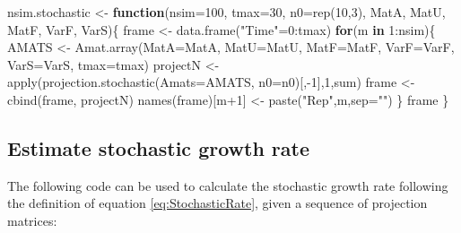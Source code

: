 \documentclass[
]{book}
\newenvironment{Shaded}{\begin{snugshade}}{\end{snugshade}}
\newcommand{\AttributeTok}[1]{\textcolor[rgb]{0.77,0.63,0.00}{#1}}
\newcommand{\ControlFlowTok}[1]{\textcolor[rgb]{0.13,0.29,0.53}{\textbf{#1}}}
\newcommand{\DecValTok}[1]{\textcolor[rgb]{0.00,0.00,0.81}{#1}}
\newcommand{\FunctionTok}[1]{\textcolor[rgb]{0.00,0.00,0.00}{#1}}
\newcommand{\NormalTok}[1]{#1}
\newcommand{\OtherTok}[1]{\textcolor[rgb]{0.56,0.35,0.01}{#1}}
\newcommand{\SpecialCharTok}[1]{\textcolor[rgb]{0.00,0.00,0.00}{#1}}
\newcommand{\StringTok}[1]{\textcolor[rgb]{0.31,0.60,0.02}{#1}}
\begin{document}
\begin{Shaded}
\begin{Highlighting}[]
\NormalTok{nsim.stochastic }\OtherTok{\textless{}{-}} \ControlFlowTok{function}\NormalTok{(}\AttributeTok{nsim=}\DecValTok{100}\NormalTok{, }\AttributeTok{tmax=}\DecValTok{30}\NormalTok{, }\AttributeTok{n0=}\FunctionTok{rep}\NormalTok{(}\DecValTok{10}\NormalTok{,}\DecValTok{3}\NormalTok{), MatA, MatU, MatF, VarF, VarS)\{}
\NormalTok{  frame }\OtherTok{\textless{}{-}}  \FunctionTok{data.frame}\NormalTok{(}\StringTok{"Time"}\OtherTok{=}\DecValTok{0}\SpecialCharTok{:}\NormalTok{tmax)}
  \ControlFlowTok{for}\NormalTok{(m }\ControlFlowTok{in} \DecValTok{1}\SpecialCharTok{:}\NormalTok{nsim)\{}
\NormalTok{  AMATS }\OtherTok{\textless{}{-}} \FunctionTok{Amat.array}\NormalTok{(}\AttributeTok{MatA=}\NormalTok{MatA, }\AttributeTok{MatU=}\NormalTok{MatU, }\AttributeTok{MatF=}\NormalTok{MatF, }\AttributeTok{VarF=}\NormalTok{VarF, }\AttributeTok{VarS=}\NormalTok{VarS, }\AttributeTok{tmax=}\NormalTok{tmax)}
\NormalTok{   projectN }\OtherTok{\textless{}{-}} \FunctionTok{apply}\NormalTok{(}\FunctionTok{projection.stochastic}\NormalTok{(}\AttributeTok{Amats=}\NormalTok{AMATS, }\AttributeTok{n0=}\NormalTok{n0)[,}\SpecialCharTok{{-}}\DecValTok{1}\NormalTok{],}\DecValTok{1}\NormalTok{,sum)}
\NormalTok{  frame }\OtherTok{\textless{}{-}} \FunctionTok{cbind}\NormalTok{(frame, projectN)}
  \FunctionTok{names}\NormalTok{(frame)[m}\SpecialCharTok{+}\DecValTok{1}\NormalTok{] }\OtherTok{\textless{}{-}} \FunctionTok{paste}\NormalTok{(}\StringTok{"Rep"}\NormalTok{,m,}\AttributeTok{sep=}\StringTok{""}\NormalTok{)}
\NormalTok{  \}}
\NormalTok{  frame}
\NormalTok{\}}
\end{Highlighting}
\end{Shaded}

\hypertarget{estimate-stochastic-growth-rate}{%
\subsection{Estimate stochastic growth rate}\label{estimate-stochastic-growth-rate}}

The following code can be used to calculate the stochastic growth rate following the definition of equation \eqref{eq:StochasticRate}, given a sequence of projection matrices:
\end{document}
